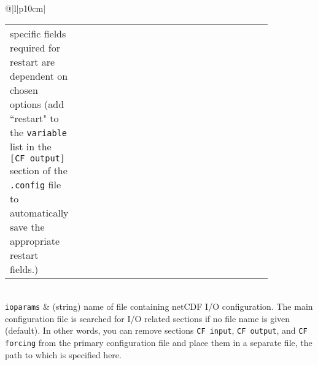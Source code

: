 \begin{center}
\begin{supertabular*}{\textwidth}{@{\extracolsep{\fill}}|l|p{10cm}|}
\begin{tabular}[t]{lp{0.85\linewidth}}
           specific fields required for restart are dependent on chosen options (add ``restart" to the 
           \texttt{variable} list in the \texttt{[CF output]} section of the \texttt{.config} file to automatically save the appropriate restart fields.)\\
    \end{tabular}\\
    \hline
    \texttt{ioparams} & (string) name of file containing netCDF I/O configuration. The main configuration file is searched for I/O related sections if no file name is given (default).  In other words, you can remove sections \texttt{CF input}, \texttt{CF output}, and \texttt{CF forcing} from the primary configuration file and place them in a separate file, the path to which is specified here.\\




\end{supertabular*}
\end{center}
